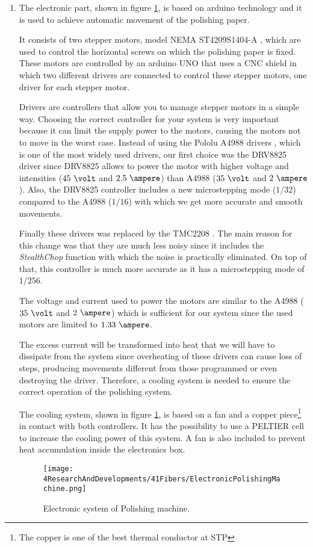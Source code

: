 \begin{enumerate}
\item{} The electronic part, shown in figure \ref{fig:ElectronicSystemPolishingMachine}, is based on arduino technology and it is used to achieve automatic movement of the polishing paper.

It consists of two stepper motors, model NEMA ST4209S1404-A \cite{StepperMotors}, which are used to control the horizontal screws on which the polishing paper is fixed. These motors are controlled by an arduino UNO \cite{ArduinoUNO} that uses a CNC shield \cite{CNCShield} in which two different drivers are connected to control these stepper motors, one driver for each stepper motor.

Drivers are controllers that allow you to manage stepper motors in a simple way. Choosing the correct controller for your system is very important because it can limit the supply power to the motors, causing the motors not to move in the worst case. Instead of using the Pololu A4988 drivers \cite{A4988Driver}, which is one of the most widely used drivers, our first choice was the DRV8825 driver \cite{DRV8825Driver} since DRV8825 allows to power the motor with higher voltage and intensities ($45~\volt$ and $2.5~\ampere$) than A4988 ($35~\volt$ and $2~\ampere$). Also, the DRV8825 controller includes a new microstepping mode ($1/32$) compared to the A4988 ($1/16$) with which we get more accurate and smooth movements.

Finally these drivers was replaced by the TMC2208 \cite{TMC2208Driver}. The main reason for this change was that they are much less noisy since it includes the \textit{StealthChop} function with which the noise is practically eliminated. On top of that, this controller is much more accurate as it has a microstepping mode of $1/256$.

The voltage and current used to power the motors are similar to the A4988 ($35~\volt$ and $2~\ampere$) which is sufficient for our system since the used motors are limited to $1.33~\ampere$. 

The excess current will be transformed into heat that we will have to dissipate from the system since overheating of these drivers can cause loss of steps, producing movements different from those programmed or even destroying the driver. Therefore, a cooling system is needed to ensure the correct operation of the polishing system.

The cooling system, shown in figure \ref{fig:ElectronicSystemPolishingMachine}, is based on a fan and a copper piece\footnote{The copper is one of the best thermal conductor at STP} in contact with both controllers. It has the possibility to use a PELTIER cell to increase the cooling power of this system. A fan is also included to prevent heat accumulation inside the electronics box.

\begin{figure}[h]
\centering
\texttt{[image: 4ResearchAndDevelopments/41Fibers/ElectronicPolishingMachine.png]}
\caption{Electronic system of Polishing machine.\label{fig:ElectronicSystemPolishingMachine}}
\end{figure}

\end{enumerate}

